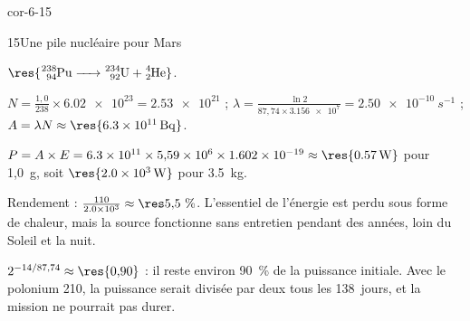 \begin{blocLivre}{cor-6-15}
\begin{corrige}{15}{Une pile nucléaire pour Mars}
\begin{questions}
\item $\res{\ce{^{238}_{94}Pu -> ^{234}_{92}U + ^{4}_{2}He}}$.
\item $N=\frac{1{,}0}{238}\times\num{6.02e23}=\num{2.53e21}$ ; $\lambda=\frac{\ln2}{87{,}74\times\num{3.156e7}}=\qty{2,50e-10}{s^{-1}}$ ;
$A=\lambda N\approx\res{\qty{6,3e11}{Bq}}$.
\item $P=A\times E=\num{6.3e11}\times5{,}59\times10^{6}\times\num{1.602e-19}\approx\res{\qty{0,57}{W}}$ pour 1,0~g, soit
$\res{\qty{2,0e3}{W}}$ pour \qty{3,5}{kg}.
\item Rendement : $\frac{110}{\num{2.0e3}}\approx\res{5{,}5~\%}$. L'essentiel de l'énergie est perdu sous forme de chaleur,
mais la source fonctionne sans entretien pendant des années, loin du Soleil et la nuit.
\item $2^{-14/87{,}74}\approx\res{0{,}90}$ : il reste environ 90~\% de la puissance initiale. Avec le polonium 210, la
puissance serait divisée par deux tous les 138~jours, et la mission ne pourrait pas durer.
\end{questions}
\end{corrige}
\end{blocLivre}
